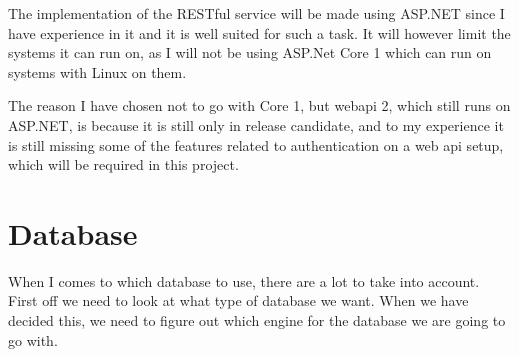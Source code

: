 The implementation of the RESTful service will be made using ASP.NET since I have experience in it and it is well suited for such a task. It will however limit the systems it can run on, as I will not be using ASP.Net Core 1 which can run on systems with Linux on them\cite{asp5:intro}.

The reason I have chosen not to go with Core 1, but webapi 2, which still runs on ASP.NET, is because it is still only in release candidate\cite{asp_core_1:roadmap}, and to my experience it is still missing some of the features related to authentication on a web api setup, which will be required in this project.

\begin{table}[h]
  \caption{Pros and cons of different ways of serving the data}
  \label{tab:serving-pro-con}
\end{table}

\section{Database }
\label{sec:Database_engine}
When I comes to which database to use, there are a lot to take into account. First off we need to look at what type of database we want. When we have decided this, we need to figure out which engine for the database we are going to go with.

